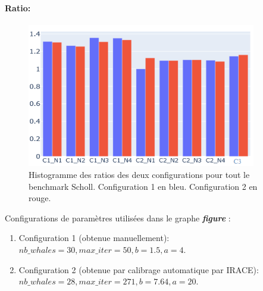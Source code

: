 \documentclass[12pt]{article}
\begin{document}
\paragraph{Ratio: }
\begin{figure}[h!]
    \includegraphics[width=10cm]{../figures/WOA/ratio_woa_configs.png}
    \caption{Histogramme des ratios des deux configurations pour tout le benchmark Scholl. Configuration 1 en bleu. Configuration 2 en rouge.}
    \label{fig:ratio}
\end{figure}
Configurations de paramètres utilisées dans le graphe \textbf{\emph{figure }}:
\begin{enumerate}
    \item Configuration 1 (obtenue manuellement): \(nb\_whales=30, max\_iter=50, b=1.5, a=4\).
    \item Configuration 2 (obtenue par calibrage automatique par IRACE): \(nb\_whales=28, max\_iter=271,  b=7.64, a=20\).
\end{enumerate}
\end{document}
